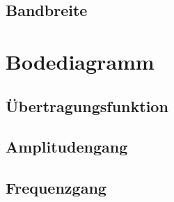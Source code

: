 \subsection{Bandbreite}



\section{Bodediagramm}
\subsection{Übertragungsfunktion}
\subsection{Amplitudengang}
\subsection{Frequenzgang}